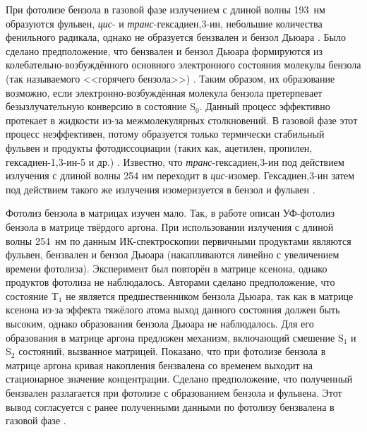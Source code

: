 {При фотолизе бензола в газовой фазе излучением с длиной волны 193~нм образуются фульвен, {\it цис}- и {\it транс}\nobreakdash-гексадиен,3\nobreakdash-ин, небольшие количества фенильного радикала, однако не 
образуется бензвален и бензол Дьюара \cite{Ward1968a, Kaplan1968a, Tsai2000}. Было сделано предположение, что бензвален и бензол Дьюара формируются из колебательно-возбуждённого основного электронного состояния 
молекулы бензола (так называемого <<горячего бензола>>) \cite{Ward1968a, Nakashima1989, Yatsuhashi2001}. Таким образом, их образование возможно, если электронно-возбуждённая молекула бензола претерпевает безызлучательную конверсию в состояние S$_0$.
Данный процесс эффективно протекает в жидкости из-за межмолекулярных столкновений. В газовой фазе этот процесс неэффективен, потому образуется только термически стабильный фульвен
и продукты фотодиссоциации (таких как, ацетилен, пропилен, гексадиен-1,3-ин-5 и др.) \cite{Bryce-Smith1976}. Известно, что {\it транс}\nobreakdash-гексадиен,3\nobreakdash-ин под действием излучения с длиной волны 254 нм переходит в {\it цис}-изомер. Гексадиен,3\nobreakdash-ин затем под действием такого же излучения изомеризуется в бензол и фульвен \cite{Bryce-Smith1976}.


Фотолиз бензола в матрицах изучен мало. Так, в работе \cite{Johnstone1991} описан УФ-фотолиз бензола в матрице твёрдого аргона. При использовании излучения с длиной волны 254~нм 
по данным ИК-спектроскопии первичными продуктами являются фульвен, бензвален и бензол Дьюара (накапливаются линейно с увеличением времени фотолиза). Эксперимент был повторён в матрице ксенона, однако продуктов фотолиза не наблюдалось.
Авторами сделано предположение, что состояние T$_1$ не является предшественником бензола Дьюара, так как в матрице ксенона из-за эффекта тяжёлого
атома выход данного состояния должен быть высоким, однако образования бензола Дьюара не наблюдалось. Для его образования в матрице аргона 
предложен механизм, включающий смешение S$_1$ и S$_2$ состояний, вызванное матрицей. Показано, что при фотолизе бензола в матрице аргона кривая накопления бензвалена со временем выходит на стационарное значение концентрации.
Сделано предположение, что полученный бензвален разлагается при фотолизе с образованием бензола и фульвена. Этот вывод согласуется с ранее полученными данными по фотолизу бензвалена в газовой фазе \cite{Kaplan1968, Harman1981}.  

}
